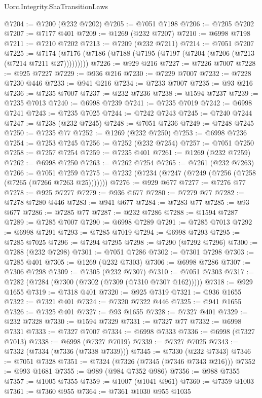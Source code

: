 \begin{lexlean}{Uorc.Integrity.ShaTransitionLaws}
\begin{coremodule}
@7204 := @7200 (@232 @7202)
@7205 := @7051 @7198
@7206 := @7205 @7202
@7207 := @7177 @401
@7209 := @1269 (@232 @7207)
@7210 := @6998 @7198
@7211 := @7210 @7202
@7213 := @7209 (@232 @7211)
@7214 := @7051 @7207
@7225 := @7174 (@7176 (@7186 (@7188 (@7195 (@7197 (@7204 (@7206 (@7213 (@7214 @7211 @27)))))))))
@7226 := @929 @216
@7227 := @7226 @7007
@7228 := @925 @7227
@7229 := @936 @216
@7230 := @7229 @7007
@7232 := @7228 @7230 @446
@7233 := @941 @216
@7234 := @7233 @7007
@7235 := @93 @216
@7236 := @7235 @7007
@7237 := @232 @7236
@7238 := @1594 @7237
@7239 := @7235 @7013
@7240 := @6998 @7239
@7241 := @7235 @7019
@7242 := @6998 @7241
@7243 := @7235 @7025
@7244 := @7242 @7243
@7245 := @7240 @7244
@7247 := @7238 (@232 @7245)
@7248 := @7051 @7236
@7249 := @7248 @7245
@7250 := @7235 @77
@7252 := @1269 (@232 @7250)
@7253 := @6998 @7236
@7254 := @7253 @7245
@7256 := @7252 (@232 @7254)
@7257 := @7051 @7250
@7258 := @7257 @7254
@7259 := @7235 @401
@7261 := @1269 (@232 @7259)
@7262 := @6998 @7250
@7263 := @7262 @7254
@7265 := @7261 (@232 @7263)
@7266 := @7051 @7259
@7275 := @7232 (@7234 (@7247 (@7249 (@7256 (@7258 (@7265 (@7266 @7263 @25)))))))
@7276 := @929 @677
@7277 := @7276 @77
@7278 := @925 @7277
@7279 := @936 @677
@7280 := @7279 @77
@7282 := @7278 @7280 @446
@7283 := @941 @677
@7284 := @7283 @77
@7285 := @93 @677
@7286 := @7285 @77
@7287 := @232 @7286
@7288 := @1594 @7287
@7289 := @7285 @7007
@7290 := @6998 @7289
@7291 := @7285 @7013
@7292 := @6998 @7291
@7293 := @7285 @7019
@7294 := @6998 @7293
@7295 := @7285 @7025
@7296 := @7294 @7295
@7298 := @7290 (@7292 @7296)
@7300 := @7288 (@232 @7298)
@7301 := @7051 @7286
@7302 := @7301 @7298
@7303 := @7285 @401
@7305 := @1269 (@232 @7303)
@7306 := @6998 @7286
@7307 := @7306 @7298
@7309 := @7305 (@232 @7307)
@7310 := @7051 @7303
@7317 := @7282 (@7284 (@7300 (@7302 (@7309 (@7310 @7307 @162)))))
@7318 := @929 @1655
@7319 := @7318 @401
@7320 := @925 @7319
@7321 := @936 @1655
@7322 := @7321 @401
@7324 := @7320 @7322 @446
@7325 := @941 @1655
@7326 := @7325 @401
@7327 := @93 @1655
@7328 := @7327 @401
@7329 := @232 @7328
@7330 := @1594 @7329
@7331 := @7327 @77
@7332 := @6998 @7331
@7333 := @7327 @7007
@7334 := @6998 @7333
@7336 := @6998 (@7327 @7013)
@7338 := @6998 (@7327 @7019)
@7339 := @7327 @7025
@7343 := @7332 (@7334 (@7336 (@7338 @7339)))
@7345 := @7330 (@232 @7343)
@7346 := @7051 @7328
@7351 := @7324 (@7326 (@7345 (@7346 @7343 @216)))
@7352 := @993 @1681
@7355 := @989 (@984 @7352 @986)
@7356 := @988 @7355
@7357 := @1005 @7355
@7359 := @1007 (@1041 @961)
@7360 := @7359 @1003
@7361 := @7360 @955
@7364 := @7361 @1030 @955 @1035

\end{coremodule}
\end{lexlean}
